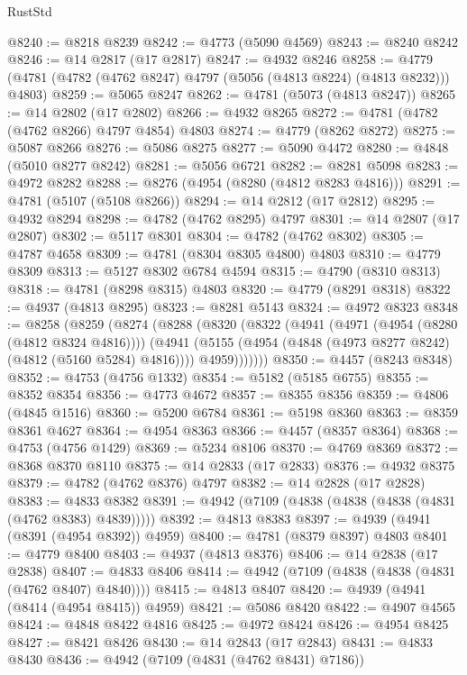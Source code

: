 \begin{lexlean}{RustStd}
\begin{coremodule}
@8240 := @8218 @8239
@8242 := @4773 (@5090 @4569)
@8243 := @8240 @8242
@8246 := @14 @2817 (@17 @2817)
@8247 := @4932 @8246
@8258 := @4779 (@4781 (@4782 (@4762 @8247) @4797 (@5056 (@4813 @8224) (@4813 @8232))) @4803)
@8259 := @5065 @8247
@8262 := @4781 (@5073 (@4813 @8247))
@8265 := @14 @2802 (@17 @2802)
@8266 := @4932 @8265
@8272 := @4781 (@4782 (@4762 @8266) @4797 @4854) @4803
@8274 := @4779 (@8262 @8272)
@8275 := @5087 @8266
@8276 := @5086 @8275
@8277 := @5090 @4472
@8280 := @4848 (@5010 @8277 @8242)
@8281 := @5056 @6721
@8282 := @8281 @5098
@8283 := @4972 @8282
@8288 := @8276 (@4954 (@8280 (@4812 @8283 @4816)))
@8291 := @4781 (@5107 (@5108 @8266))
@8294 := @14 @2812 (@17 @2812)
@8295 := @4932 @8294
@8298 := @4782 (@4762 @8295) @4797
@8301 := @14 @2807 (@17 @2807)
@8302 := @5117 @8301
@8304 := @4782 (@4762 @8302)
@8305 := @4787 @4658
@8309 := @4781 (@8304 @8305 @4800) @4803
@8310 := @4779 @8309
@8313 := @5127 @8302 @6784 @4594
@8315 := @4790 (@8310 @8313)
@8318 := @4781 (@8298 @8315) @4803
@8320 := @4779 (@8291 @8318)
@8322 := @4937 (@4813 @8295)
@8323 := @8281 @5143
@8324 := @4972 @8323
@8348 := @8258
    (@8259
      (@8274
        (@8288
          (@8320
            (@8322
              (@4941
                (@4971 (@4954 (@8280 (@4812 @8324 @4816))))
                (@4941
                  (@5155 (@4954 (@4848 (@4973 @8277 @8242) (@4812 (@5160 @5284) @4816))))
                  @4959)))))))
@8350 := @4457 (@8243 @8348)
@8352 := @4753 (@4756 @1332)
@8354 := @5182 (@5185 @6755)
@8355 := @8352 @8354
@8356 := @4773 @4672
@8357 := @8355 @8356
@8359 := @4806 (@4845 @1516)
@8360 := @5200 @6784
@8361 := @5198 @8360
@8363 := @8359 @8361 @4627
@8364 := @4954 @8363
@8366 := @4457 (@8357 @8364)
@8368 := @4753 (@4756 @1429)
@8369 := @5234 @8106
@8370 := @4769 @8369
@8372 := @8368 @8370 @8110
@8375 := @14 @2833 (@17 @2833)
@8376 := @4932 @8375
@8379 := @4782 (@4762 @8376) @4797
@8382 := @14 @2828 (@17 @2828)
@8383 := @4833 @8382
@8391 := @4942 (@7109 (@4838 (@4838 (@4838 (@4831 (@4762 @8383) @4839)))))
@8392 := @4813 @8383
@8397 := @4939 (@4941 (@8391 (@4954 @8392)) @4959)
@8400 := @4781 (@8379 @8397) @4803
@8401 := @4779 @8400
@8403 := @4937 (@4813 @8376)
@8406 := @14 @2838 (@17 @2838)
@8407 := @4833 @8406
@8414 := @4942 (@7109 (@4838 (@4838 (@4831 (@4762 @8407) @4840))))
@8415 := @4813 @8407
@8420 := @4939 (@4941 (@8414 (@4954 @8415)) @4959)
@8421 := @5086 @8420
@8422 := @4907 @4565
@8424 := @4848 @8422 @4816
@8425 := @4972 @8424
@8426 := @4954 @8425
@8427 := @8421 @8426
@8430 := @14 @2843 (@17 @2843)
@8431 := @4833 @8430
@8436 := @4942 (@7109 (@4831 (@4762 @8431) @7186))

\end{coremodule}
\end{lexlean}
